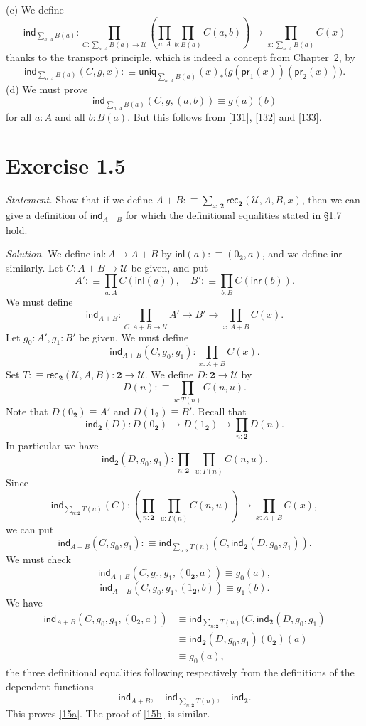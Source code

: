 \documentclass[12pt]{article}
\newcommand{\two}{\mathbf2}
\newcommand{\nn}{\noindent}
\newcommand{\ind}{\mathsf{ind}}
\newcommand{\inl}{\mathsf{inl}}
\newcommand{\inr}{\mathsf{inr}}
\newcommand{\pr}{\mathsf{pr}}
\newcommand{\rec}{\mathsf{rec}}
\newcommand{\uniq}{\mathsf{uniq}}
\newcommand{\U}{\mathcal U}
\begin{document}
\nn(c) We define
$$
\ind_{\sum_{a:A}B(a)} : \prod_{C:\sum_{a:A}B(a)\to\U} 
\left(\prod_{a:A}\prod_{b:B(a)} C(a,b)\right) 
\to \prod_{x:\sum_{a:A}B(a)} C(x)
$$
thanks to the transport principle, which is indeed a concept from Chapter~2, by
\begin{equation}\label{133}
\ind_{\sum_{a:A}B(a)}(C,g,x):
\equiv\uniq_{\sum_{a:A}B(a)}(x)_*\Big(g(\pr_1(x))(\pr_2(x))\Big).
\end{equation}
(d) We must prove 
$$
\ind_{\sum_{a:A}B(a)}(C,g,(a,b))\equiv g(a)(b)
$$
for all $a:A$ and all $b:B(a)$. But this follows from \eqref{131}, \eqref{132} and \eqref{133}.


\section{Exercise 1.5}

\emph{Statement.} Show that if we define $A+B:\equiv\sum_{x:\two}\rec_\two(\U,A,B,x)$, then we can give a definition of $\ind_{A+B}$ for which the definitional equalities stated in \S1.7 hold.

\nn\emph{Solution.} We define $\inl:A\to A+B$ by $\inl(a):\equiv(0_\two,a)$, and we define $\inr$ similarly. Let $C:A+B\to\U$ be given, and put 
$$
A':\equiv\prod_{a:A}C(\inl(a)),\quad B':\equiv\prod_{b:B}C(\inr(b)).
$$
We must define 
$$
\ind_{A+B}:\prod_{C:A+B\to\U}A'\to B'\to\prod_{x:A+B}C(x).
$$ 
Let $g_0:A',g_1:B'$ be given. We must define 
$$
\ind_{A+B}(C,g_0,g_1):\prod_{x:A+B}C(x).
$$ 
Set $T:\equiv\rec_\two(\U,A,B):\two\to\U$. We define $D:\two\to\U$ by 
$$
D(n):\equiv\prod_{u:T(n)}C(n,u).
$$ 
Note that $D(0_\two)\equiv A'$ and $D(1_\two)\equiv B'$. Recall that 
$$
\ind_\two(D):D(0_\two)\to D(1_\two)\to\prod_{n:\two}D(n).
$$ 
In particular we have 
$$
\ind_\two(D,g_0,g_1):\prod_{n:\two}\ \prod_{u:T(n)}C(n,u).
$$ 
Since 
$$
\ind_{\sum_{n:\two}T(n)}(C):\left(\prod_{n:\two}\ \prod_{u:T(n)}C(n,u)\right)\to\prod_{x:A+B}C(x),
$$ 
we can put 
$$
\ind_{A+B}(C,g_0,g_1):\equiv\ind_{\sum_{n:\two}T(n)}(C,\ind_\two(D,g_0,g_1)).
$$ 
We must check 
\begin{equation}\label{15a}
\ind_{A+B}(C,g_0,g_1,(0_\two,a))\equiv g_0(a),
\end{equation}
\begin{equation}\label{15b}
\ind_{A+B}(C,g_0,g_1,(1_\two,b))\equiv g_1(b).
\end{equation} 
We have 
\begin{align*}
\ind_{A+B}(C,g_0,g_1,(0_\two,a))&\equiv\ind_{\sum_{n:\two}T(n)}(C,\ind_\two(D,g_0,g_1)\\ 
&\equiv\ind_\two(D,g_0,g_1)(0_\two)(a)\\ 
&\equiv g_0(a),
\end{align*}
the three definitional equalities following respectively from the definitions of the dependent functions
$$
\ind_{A+B},\quad\ind_{\sum_{n:\two}T(n)},\quad\ind_\two.
$$ 
This proves \eqref{15a}. The proof of \eqref{15b} is similar.
\end{document}
